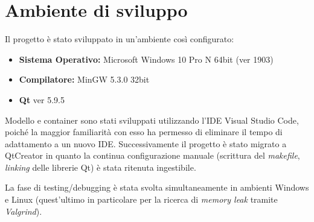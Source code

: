 \documentclass[
  10pt,
]{article}
\providecommand{\tightlist}{%
  \setlength{\itemsep}{0pt}\setlength{\parskip}{0pt}}
\begin{document}
\hypertarget{ambiente-di-sviluppo}{%
\section{Ambiente di sviluppo}\label{ambiente-di-sviluppo}}

Il progetto è stato sviluppato in un'ambiente così configurato:

\begin{itemize}
\tightlist
\item
  \textbf{Sistema Operativo:} Microsoft Windows 10 Pro N 64bit (ver
  1903)
\item
  \textbf{Compilatore:} MinGW 5.3.0 32bit
\item
  \textbf{Qt} ver 5.9.5
\end{itemize}

Modello e container sono stati sviluppati utilizzando l'IDE Visual
Studio Code, poiché la maggior familiarità con esso ha permesso di
eliminare il tempo di adattamento a un nuovo IDE. Successivamente il
progetto è stato migrato a QtCreator in quanto la continua
configurazione manuale (scrittura del \emph{makefile}, \emph{linking}
delle librerie Qt) è stata ritenuta ingestibile.

La fase di testing/debugging è stata svolta simultaneamente in ambienti
Windows e Linux (quest'ultimo in particolare per la ricerca di
\emph{memory leak} tramite \emph{Valgrind}).
\end{document}
